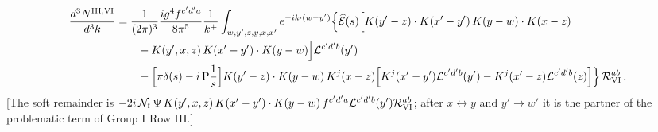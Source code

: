 \documentclass[9pt]{article}
\numberwithin{equation}{section}
\begin{document}
{\color{red}
\begin{align}
\frac{d^{3}N^{\rm III,VI}}{d^{3}k}&=\frac{1}{(2\pi)^{3}}\frac{ig^{4}f^{c'd'a}}{8\pi^{5}}\frac{1}{k^{+}}\int_{w,y',z,y,x,x'}e^{-ik\cdot(w-y')}\Big\{\widehat{\mathcal{E}}(s)\Big[K(y'-z)\cdot K(x'-y')\,K(y-w)\cdot K(x-z)\notag\\&\qquad-K(y',x,z)\,K(x'-y')\cdot K(y-w)\Big]\mathcal{L}^{c'd'b}(y')\notag\\
&\qquad-\Big[\pi\delta(s)-i\,{\rm P}\frac1s\Big]K(y'-z)\cdot K(y-w)\,K^{j}(x-z)\Big[K^{j}(x'-y')\mathcal{L}^{c'd'b}(y')-K^{j}(x'-z)\mathcal{L}^{c'd'b}(z)\Big]\Big\}\,\mathcal{R}_{\rm VI}^{ab}\,.\label{eq:fx-G3R6}
\end{align}
{\color{red}[The soft remainder is $-2i\,\mathcal{N}_{\rm f}\,\Psi\,K(y',x,z)\,K(x'-y')\cdot K(y-w)\,f^{c'd'a}\mathcal{L}^{c'd'b}(y')\mathcal{R}_{\rm VI}^{ab}$; after $x\leftrightarrow y$ and $y'\to w'$ it is the partner of the problematic term of Group I Row III.]}}\par
\end{document}

